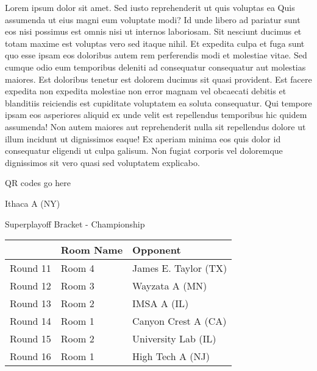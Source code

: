 \documentclass{article}%
\begin{document}
\vspace*{8pt}%
\linebreak%
\newline%
\newline%
    Lorem ipsum dolor sit amet. Sed iusto reprehenderit ut quis voluptas ea Quis assumenda ut eius magni eum voluptate modi? Id unde libero ad pariatur sunt eos nisi possimus est omnis nisi ut internos laboriosam. Sit nesciunt ducimus et totam maxime est voluptas vero sed itaque nihil. Et expedita culpa et fuga sunt quo esse ipsam eos doloribus autem rem perferendis modi et molestiae vitae.\newline%
\newline%
    Sed cumque odio eum temporibus deleniti ad consequatur consequatur aut molestias maiores. Est doloribus tenetur est dolorem ducimus sit quasi provident. Est facere expedita non expedita molestiae non error magnam vel obcaecati debitis et blanditiis reiciendis est cupiditate voluptatem ea soluta consequatur. Qui tempore ipsam eos asperiores aliquid ex unde velit est repellendus temporibus hic quidem assumenda!\newline%
\newline%
    Non autem maiores aut reprehenderit nulla sit repellendus dolore ut illum incidunt ut dignissimos eaque! Ex aperiam minima eos quis dolor id consequatur eligendi ut culpa galisum. Non fugiat corporis vel doloremque dignissimos sit vero quasi sed voluptatem explicabo.\newline%
\newline%
\vspace*{30pt}%
\begin{center}%
\begin{Huge}%
QR codes go here%
\end{Huge}%
\end{center}%
\newpage%
\begin{center}%
\begin{Huge}%
Ithaca A (NY)%
\end{Huge}%
\vspace*{8pt}%
\linebreak%
\begin{Large}%
Superplayoff Bracket {-} Championship%
\end{Large}%
\end{center}%
%
\begin{tabularx}{\textwidth}{|c|Y|Y|}%
\hline%
&Room Name&Opponent\\%
\hline%
Round 11&Room 4&James E. Taylor (TX)\\%
Round 12&Room 3&Wayzata A (MN)\\%
Round 13&Room 2&IMSA A (IL)\\%
Round 14&Room 1&Canyon Crest A (CA)\\%
Round 15&Room 2&University Lab (IL)\\%
Round 16&Room 1&High Tech A (NJ)\\%
\hline%
\end{tabularx}%
\end{document}
